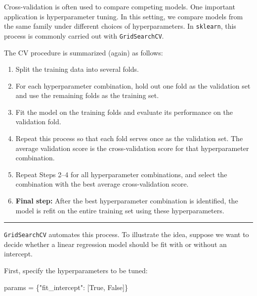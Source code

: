 \documentclass[
  letterpaper,
  DIV=11,
  numbers=noendperiod]{scrreprt}
\newenvironment{Shaded}{\begin{snugshade}}{\end{snugshade}}
\newcommand{\NormalTok}[1]{\textcolor[rgb]{0.00,0.23,0.31}{#1}}
\newcommand{\OperatorTok}[1]{\textcolor[rgb]{0.37,0.37,0.37}{#1}}
\newcommand{\StringTok}[1]{\textcolor[rgb]{0.13,0.47,0.30}{#1}}
\newcommand{\VariableTok}[1]{\textcolor[rgb]{0.07,0.07,0.07}{#1}}
\providecommand{\tightlist}{%
  \setlength{\itemsep}{0pt}\setlength{\parskip}{0pt}}
\theoremstyle{definition}
\theoremstyle{definition}
\theoremstyle{plain}
\theoremstyle{plain}
\theoremstyle{remark}
\begin{document}
Cross-validation is often used to compare competing models. One
important application is hyperparameter tuning. In this setting, we
compare models from the same family under different choices of
hyperparameters. In \texttt{sklearn}, this process is commonly carried
out with \texttt{GridSearchCV}.

The CV procedure is summarized (again) as follows:

\begin{enumerate}
\def\labelenumi{\arabic{enumi}.}
\tightlist
\item
  Split the training data into several folds.
\item
  For each hyperparameter combination, hold out one fold as the
  validation set and use the remaining folds as the training set.
\item
  Fit the model on the training folds and evaluate its performance on
  the validation fold.
\item
  Repeat this process so that each fold serves once as the validation
  set. The average validation score is the cross-validation score for
  that hyperparameter combination.
\item
  Repeat Steps 2--4 for all hyperparameter combinations, and select the
  combination with the best average cross-validation score.
\item
  \textbf{Final step:} After the best hyperparameter combination is
  identified, the model is refit on the entire training set using these
  hyperparameters.
\end{enumerate}

\begin{center}\rule{0.5\linewidth}{0.5pt}\end{center}

\texttt{GridSearchCV} automates this process. To illustrate the idea,
suppose we want to decide whether a linear regression model should be
fit with or without an intercept.

First, specify the hyperparameters to be tuned:

\begin{Shaded}
\begin{Highlighting}[]
\NormalTok{params }\OperatorTok{=}\NormalTok{ \{}\StringTok{"fit\_intercept"}\NormalTok{: [}\VariableTok{True}\NormalTok{, }\VariableTok{False}\NormalTok{]\}}
\end{Highlighting}
\end{Shaded}
\end{document}
